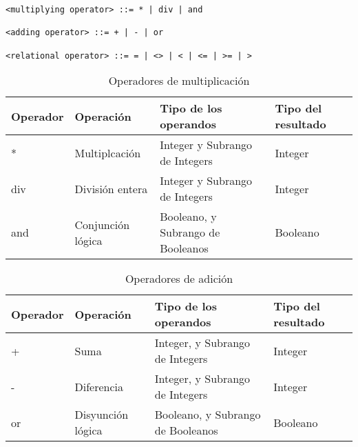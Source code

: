 \documentclass[a4paper,oneside]{report}
\begin{document}
\begin{verbatim}
<multiplying operator> ::= * | div | and

<adding operator> ::= + | - | or

<relational operator> ::= = | <> | < | <= | >= | >
\end{verbatim}

\begin{table}[htbp]
	 \centering
    \begin{tabular}{|l|l|l|l|}
	    
	    \hline \textbf{Operador} & \textbf{Operación} & \textbf{Tipo de los operandos }& \textbf{Tipo del resultado} \\
			\hline
	    *     & Multiplcación & Integer y Subrango de Integers & Integer \\
	    \hline
	    div   & División entera & Integer y Subrango de Integers & Integer \\
	    \hline
	    and   & Conjunción lógica & Booleano, y Subrango de Booleanos & Booleano \\
	    \hline
    \end{tabular}%
  \label{tab:opmul}%
  \caption{Operadores de multiplicación}
\end{table}%

\begin{table}[htbp]

   \centering
    \begin{tabular}{|l|l|l|l|}
    \hline
    \textbf{Operador} & \textbf{Operación} & \textbf{Tipo de los operandos }& \textbf{Tipo del resultado} \\
		\hline
    +     & Suma  & Integer, y Subrango de Integers & Integer \\
    \hline
    
    -     & Diferencia & Integer, y Subrango de Integers & Integer \\
    \hline
    or    & Disyunción lógica & Booleano, y Subrango de Booleanos & Booleano \\
    \hline
    \end{tabular}%
  \label{tab:opsum}%
  
  \caption{Operadores de adición}
\end{table}%
\end{document}
